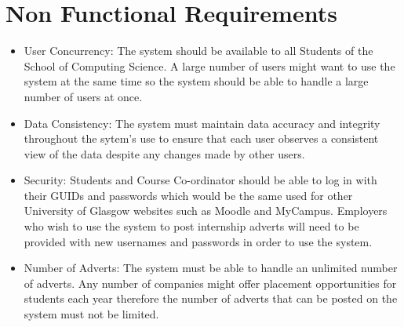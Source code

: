\documentclass{l3deliverable}
\begin{document}
\begin{UseCaseTemplate}
\UseCaseNonFunctionalRequirements{}
\UseCaseRisks{}
\end{UseCaseTemplate}

\section{Non Functional Requirements}

\begin{itemize}
\item User Concurrency: The system should be available to all Students of the School of Computing Science. A large number of users might want to use the system at the same time so the system should be able to handle a large number of users at once.
\item Data Consistency: The system must maintain data accuracy and integrity throughout the sytem's use to ensure that each user observes a consistent view of the data despite any changes made by other users.
\item Security: Students and Course Co-ordinator should be able to log in with their GUIDs and passwords which would be the same used for other University of Glasgow websites such as Moodle and MyCampus. Employers who wish to use the system to post internship adverts will need to be provided with new usernames and passwords in order to use the system.
\item Number of Adverts: The system must be able to handle an unlimited number of adverts. Any number of companies might offer placement opportunities for students each year therefore the number of adverts that can be posted on the system must not be limited.
\end{itemize}
\end{document}
